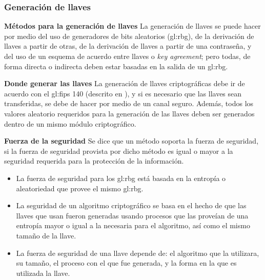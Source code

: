 %
%

\subsubsection{Generación de llaves}
\label{sec:generacion_llaves}


\textbf{Métodos para la generación de llaves}
La generación de llaves se puede hacer por medio del uso de generadores de 
bits aleatorios (\gls{gl:rbg}), de la derivación de llaves a partir de otras, 
de la derivación de llaves a partir de una contraseña, y del uso de un esquema 
de acuerdo entre llaves o \textit{key agreement}; pero todas, de forma directa 
o indirecta deben estar basadas en la salida de un \gls{gl:rbg}.

\textbf{Donde generar las llaves}
La generación de llaves criptográficas debe ir de acuerdo con el \gls{gl:fips} 
140 (descrito en \cite{nist_modulos_criptograficos}), y si es necesario que 
las llaves sean transferidas, se debe de hacer por medio de un canal seguro. 
Además, todos los valores aleatorio requeridos para la generación de las 
llaves deben ser generados dentro de un mismo módulo criptográfico.

\textbf{Fuerza de la seguridad}
Se dice que un método soporta la fuerza de seguridad, si la fuerza de 
seguridad provista por dicho método es igual o mayor a la seguridad 
requerida para la protección de la información.
\begin{itemize}

  \item La fuerza de seguridad para los \gls{gl:rbg} está basada en la 
    entropía o aleatoriedad que provee el mismo \gls{gl:rbg}.

  \item La seguridad de un algoritmo criptográfico se basa en el hecho de que 
  las llaves que usan fueron generadas usando procesos que las proveían de 
  una entropía mayor o igual a la necesaria para el algoritmo, así como el 
  mismo tamaño de la llave.

  \item La fuerza de seguridad de una llave depende de: el algoritmo que la 
  utilizara, su tamaño, el proceso con el que fue generada, y la forma en la 
  que es utilizada la llave.

\end{itemize}

